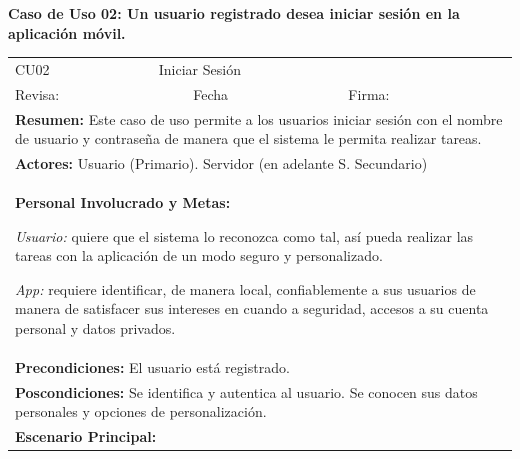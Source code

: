 		\textbf{Caso de Uso 02: Un usuario registrado desea iniciar sesión en la aplicación móvil.}
			\begin{longtable}{|l|p{5.5cm}|l|p{2cm}|l|p{1.9cm}|} \hline
				\cellcolor{grisOscuro} CU02 & \multicolumn{4}{|l|}{  \cellcolor{grisOscuro} Iniciar Sesión} &  \cellcolor{grisClaro}\multirow{2}{1cm}{} \\ \cline{1-5}
				\cellcolor{grisOscuro} Revisa: &  \cellcolor{grisClaro} &  \cellcolor{grisOscuro} Fecha &  \cellcolor{grisClaro} &  \cellcolor{grisOscuro} Firma: & \cellcolor{grisClaro} \\ \hline
				\multicolumn{6}{|p{15cm}|}{ \textbf{Resumen: } Este caso de uso permite a los usuarios iniciar sesión con el nombre de usuario y contraseña de manera que el sistema le permita realizar tareas.

				} \\ \hline

				\multicolumn{6}{|p{15cm}|}{ \textbf{Actores: } Usuario (Primario). Servidor (en adelante S. Secundario)

				} \\ \hline

				\multicolumn{6}{|p{15cm}|}{ \textbf{Personal Involucrado y Metas: }

				\emph{Usuario:} quiere que el sistema lo reconozca como tal, así pueda realizar las tareas con la aplicación de un modo seguro y personalizado.

				\emph{App:} requiere identificar, de manera local, confiablemente a sus usuarios de manera de satisfacer sus intereses en cuando a seguridad, accesos a su cuenta personal y datos privados.

				} \\ \hline

				\multicolumn{6}{|p{15cm}|}{ \textbf{Precondiciones: } El usuario está registrado.

				} \\ \hline

				\multicolumn{6}{|p{15cm}|}{ \textbf{Poscondiciones: } Se identifica y autentica al usuario. Se conocen sus datos personales y opciones de personalización.

				} \\ \hline

				\multicolumn{6}{|p{15cm}|}{ \textbf{Escenario Principal: }

}
\end{longtable}

